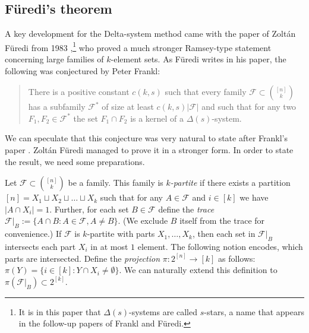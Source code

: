 \documentclass[graybox]{svmult}
\newcommand{\ff}{\mathcal{F}}
\newcommand{\m}{\mathcal}
\begin{document}
\subsection{F{\"{u}}redi's theorem}\label{sec31}
A key development for the Delta-system method came with the paper of Zolt\'an F\"uredi from 1983 \cite{Fu1},\footnote{It is in this paper that $\Delta(s)$-systems are called $s$-stars, a name that appears in the follow-up papers of Frankl and F\"uredi.} who proved a much stronger Ramsey-type statement concerning large families of $k$-element sets. As F\"uredi writes in his paper, the following was conjectured by Peter Frankl:
\begin{quote}
  There is a positive constant $c(k,s)$ such that every family $\ff\subset {[n]\choose k}$ has a subfamily $\ff^*$ of size at least $c(k,s)|\ff|$ and such that for any two $F_1,F_2\in \ff^*$ the set $F_1\cap F_2$ is a kernel of a $\Delta(s)$-system.
\end{quote}
We can speculate that this conjecture was very natural to state after Frankl's paper \cite{Fra83}. Zolt\'an F\"uredi managed to prove it in a stronger form. In order to state the result, we need some preparations.

Let $\ff\subset {[n]\choose k}$ be a family. This family is {\it $k$-partite} if there exists a partition $[n] = X_1\sqcup X_2\sqcup\ldots \sqcup X_k$ such that for any $A\in \m F$ and $i\in[k]$ we have $|A\cap X_i|=1$. Further, for each set $B\in \ff$ define the {\it trace} $\ff|_B:=\{A\cap B: A\in \ff, A\ne B\}$. (We exclude $B$ itself from the trace for convenience.) If $\ff$ is $k$-partite with parts $X_1,\ldots, X_k$, then each set in $\ff|_B$ intersects each part $X_i$ in at most $1$ element. The following notion encodes, which parts are intersected. Define the {\it projection} $\pi: 2^{[n]}\to [k]$ as follows: $\pi(Y) = \{i\in [k]: Y\cap X_i\ne \emptyset \}$. We can naturally extend this definition to $\pi(\ff|_B)\subset 2^{[k]}$. %
\end{document}
